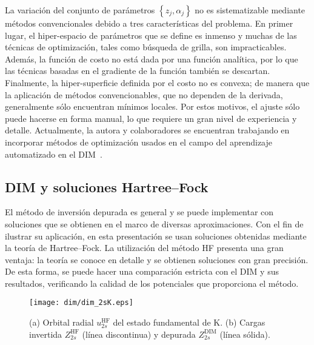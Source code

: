 La variación del conjunto de parámetros $\left\{z_j,\alpha_j\right\}$ no 
es sistematizable mediante métodos convencionales debido a tres 
características del problema. En primer lugar, el hiper-espacio de 
parámetros que se define es inmenso y muchas de las técnicas de 
optimización, tales como búsqueda de grilla, son impracticables. Además,
la función de costo no está dada por una función analítica, por lo que 
las técnicas basadas en el gradiente de la función también se descartan. 
Finalmente, la hiper-superficie definida por el costo no es convexa; de 
manera que la aplicación de métodos convencionables, que no dependen de 
la derivada, generalmente sólo encuentran mínimos locales. Por estos
motivos, el ajuste sólo puede hacerse en forma manual, lo que requiere 
un gran nivel de experiencia y detalle. Actualmente, la autora y 
colaboradores se encuentran trabajando en incorporar métodos de 
optimización usados en el campo del aprendizaje automatizado en el 
DIM~\cite{DiFilippo:19}.

\subsection{DIM y soluciones Hartree--Fock}
\label{subsec:invHF}

El método de inversión depurada es general y se puede implementar con 
soluciones que se obtienen en el marco de diversas aproximaciones. Con 
el fin de ilustrar su aplicación, en esta presentación se usan 
soluciones obtenidas mediante la teoría de Hartree--Fock. La utilización 
del método HF presenta una gran ventaja: la teoría se conoce en detalle 
y se obtienen soluciones 
con gran precisión. De esta forma, se puede hacer una comparación 
estricta con el DIM y sus resultados, verificando la calidad de los 
potenciales que proporciona el método.

\begin{figure}[t]
\centering
\texttt{[image: dim/dim\_2sK.eps]} 
\caption[Orbital radial y carga efectiva correspondiente.]
{(a) Orbital radial $u_{2s}^{\mathrm{HF}}$ del estado fundamental de K.
(b) Cargas invertida $Z_{2s}^{\mathrm{HF}}$ (línea discontinua) 
y depurada $Z_{2s}^{\mathrm{DIM}}$ (línea sólida).}
\label{fig:2sK}
\end{figure}

